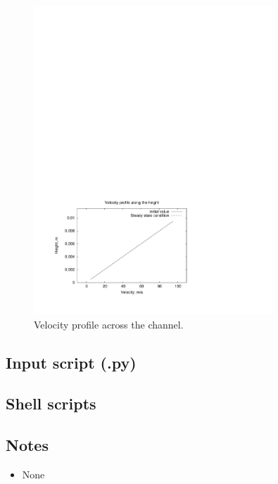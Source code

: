 \begin{figure}[htbp]
\begin{center}
\includegraphics[width=0.8\textwidth,viewport=38 49 422 302,clip=true]{../2D/couette-flow/velocity.pdf}
\end{center}
\caption{Velocity profile across the channel.}
   \label{couette-velocity-profile-fig}
\end{figure}

\bigskip
\subsection{Input script (.py)}
\topbar

\bottombar

\subsection{Shell scripts}
\label{couette-flow-2D-sh-files}
\topbar

\bottombar

\subsection{Notes}
\begin{itemize}
\item None
\end{itemize}


